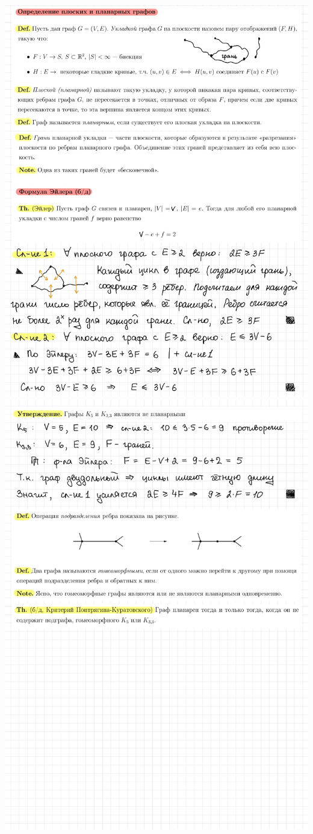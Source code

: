 \includegraphics[width=1\linewidth]{sections/Polina/imgs/15.jpg}
\newpage \includegraphics[width=1\linewidth]{sections/Polina/imgs/16.jpg}